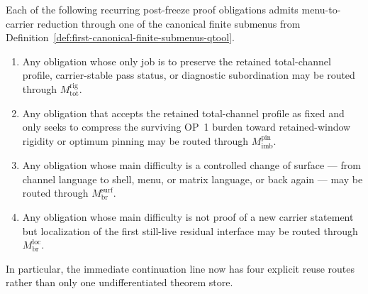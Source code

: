 \begin{proposition}
\label{prop:first-certified-submenu-reduction-routes}
Each of the following recurring post-freeze proof obligations admits menu-to-carrier reduction through one of the canonical finite submenus from Definition~\ref{def:first-canonical-finite-submenus-qtool}.
\begin{enumerate}[leftmargin=2em]
 \item Any obligation whose only job is to preserve the retained total-channel profile, carrier-stable pass status, or diagnostic subordination may be routed through \(M^{\mathrm{rig}}_{\mathrm{tot}}\).

 \item Any obligation that accepts the retained total-channel profile as fixed and only seeks to compress the surviving OP~1 burden toward retained-window rigidity or optimum pinning may be routed through \(M^{\mathrm{pin}}_{\mathrm{imb}}\).

 \item Any obligation whose main difficulty is a controlled change of surface --- from channel language to shell, menu, or matrix language, or back again --- may be routed through \(M^{\mathrm{surf}}_{\mathrm{br}}\).

 \item Any obligation whose main difficulty is not proof of a new carrier statement but localization of the first still-live residual interface may be routed through \(M^{\mathrm{loc}}_{\mathrm{br}}\).
\end{enumerate}
In particular, the immediate continuation line now has four explicit reuse routes rather than only one undifferentiated theorem store.
\end{proposition}

